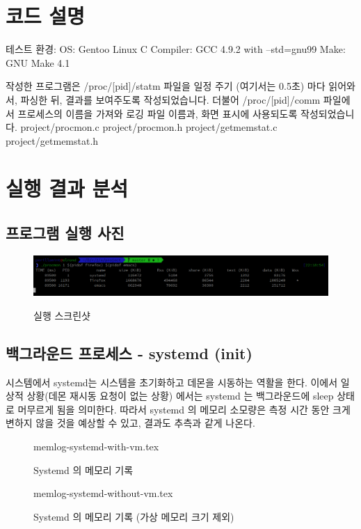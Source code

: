 \documentclass {article}
\begin{document}
\section {코드 설명}
테스트 환경:
OS: Gentoo Linux
C Compiler: GCC 4.9.2 with --std=gnu99
Make: GNU Make 4.1

작성한 프로그램은 /proc/[pid]/statm 파일을 일정 주기 (여기서는 0.5초) 마다 읽어와서, 파싱한 뒤, 결과를 보여주도록 작성되었습니다.
더불어 /proc/[pid]/comm 파일에서 프로세스의 이름을 가져와 로깅 파일 이름과, 화면 표시에 사용되도록 작성되었습니다.
{project/procmon.c}
{project/procmon.h}
{project/getmemstat.c}
{project/getmemstat.h}

\section {실행 결과 분석}
\subsection {프로그램 실행 사진}
\begin {figure}[h]
  \centering
  \includegraphics [width=120mm]{screenshot.png}
  \caption {실행 스크린샷}
  \label{fig:systemd}
\end {figure}

\newpage
\subsection{백그라운드 프로세스 - systemd (init)}
시스템에서 systemd는 시스템을 초기화하고 데몬을 시동하는 역활을 한다. 이에서 일상적 상황(데몬 재시동 요청이 없는 상황) 에서는 systemd 는 백그라운드에 sleep 상태로 머무르게 됨을 의미한다. 따라서 systemd 의 메모리 소모량은 측정 시간 동안 크게 변하지 않을 것을 예상할 수 있고, 결과도 추측과 같게 나온다.

\begin {figure}[h]
  \centering
   {memlog-systemd-with-vm.tex}
  \caption {Systemd 의 메모리 기록}
   {memlog-systemd-without-vm.tex}
  \caption {Systemd 의 메모리 기록 (가상 메모리 크기 제외)}
  \label{fig:systemd}
\end {figure}
\end{document}
